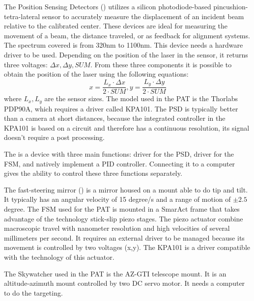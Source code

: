 The Position Sensing Detectors () utilizes a silicon photodiode-based pincushion-tetra-lateral sensor to accurately measure the displacement of an incident beam relative to the calibrated center. These devices are ideal for measuring the movement of a beam, the distance traveled, or as feedback for alignment systems.
The spectrum covered is from 320nm to 1100nm. This device needs a hardware driver to be used. Depending on the position of the laser in the sensor, it returns three voltages: $\Delta x, \Delta y, SUM$.
From these three components it is possible to obtain the position of the laser using the following equations:
\begin{equation}
  x = \frac{L_x \cdot \Delta x}{2 \cdot SUM}, y = \frac{L_y \cdot \Delta y}{2 \cdot  SUM}
\end{equation}
where $L_x,L_y$ are the sensor sizes. The model used in the PAT is the Thorlabs PDP90A, which requires a driver called KPA101.
The PSD is typically better than a camera at short distances, because the integrated controller in the KPA101 is based on a circuit and therefore has a continuous resolution, its signal doesn't require a post processing.

The  is a device with three main functions: driver for the PSD, driver for the FSM, and natively implement a PID controller. Connecting it to a computer gives the ability to control these three functions separately.


The fast-steering mirror () is a mirror housed on a mount able to do tip and tilt. It typically has an angular velocity of 15 degree/s and a range of motion of $\pm 2.5$ degree.
The FSM used for the PAT is mounted in a SmarAct frame that takes advantage of the technology stick-slip piezo stages. The piezo actuator combine macroscopic travel with nanometer resolution and high velocities of several millimeters per second.
It requires an external driver to be managed because its movement is controlled by two voltages (x,y). The KPA101 is a driver compatible with the technology of this actuator.

The Skywatcher used in the PAT is the AZ-GTI telescope mount. It is an altitude-azimuth mount controlled by two DC servo motor. It needs a computer to do the targeting.

